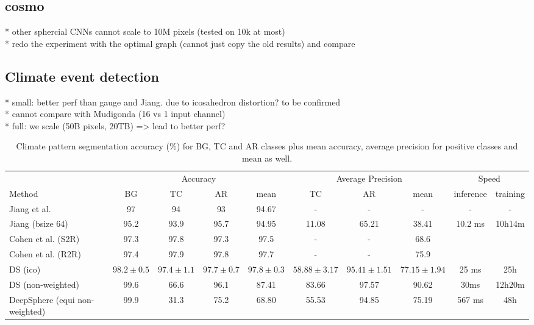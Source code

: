 \documentclass{article} %
\begin{document}
\subsection{cosmo}

* other sphercial CNNs cannot scale to 10M pixels (tested on 10k at most) \\
* redo the experiment with the optimal graph (cannot just copy the old results) and compare \\

\subsection{Climate event detection}

* small: better perf than gauge and Jiang. due to icosahedron distortion? to be confirmed\\
* cannot compare with Mudigonda (16 vs 1 input channel)\\
* full: we scale (50B pixels, 20TB) => lead to better perf?\\

\begin{table}[!ht]
\begin{tabular}{l|c c c c c c c c c}
        \multicolumn{1}{l}{} & \multicolumn{4}{c}{Accuracy} & \multicolumn{3}{c}{Average Precision} & \multicolumn{2}{c}{Speed}\\
        \cmidrule(lr){2-5}\cmidrule(lr){6-8}\cmidrule(lr){9-10}
        \multicolumn{1}{l}{Method} & BG & TC & AR & mean & TC & AR & mean & inference & training \\ \hline
        Jiang et al. & 97 & 94 & 93 & 94.67 & - & - & - & - & -\\
        Jiang (bsize 64) & 95.2 & 93.9 & 95.7 & 94.95 & 11.08 & 65.21 & 38.41 & 10.2 ms & 10h14m\\
        Cohen et al. (S2R) & 97.3 & 97.8 & 97.3 & 97.5 & - & -& 68.6\\
        Cohen et al. (R2R) & 97.4 & 97.9 & 97.8 & 97.7 & - & -& 75.9\\ \hline
        DS (ico) & $98.2\pm 0.5$ & $97.4\pm 1.1$ & $97.7\pm 0.7$ & $97.8\pm 0.3$ & $58.88\pm 3.17$ & $95.41\pm 1.51$ & $77.15\pm 1.94$ & 25 ms & 25h \\
        DS (non-weighted) & 99.6 & 66.6 & 96.1 & 87.41 & 83.66 & 97.57 & 90.62 & 30ms & 12h20m\\ \hline
        DeepSphere (equi non-weighted) & 99.9 & 31.3 & 75.2 & 68.80 & 55.53 & 94.85 & 75.19 & 567 ms & 48h
    \end{tabular}
    \caption{Climate pattern segmentation accuracy (\%) for BG, TC
and AR classes plus mean accuracy, average precision for positive classes and mean as well.}
\end{table}
\end{document}
